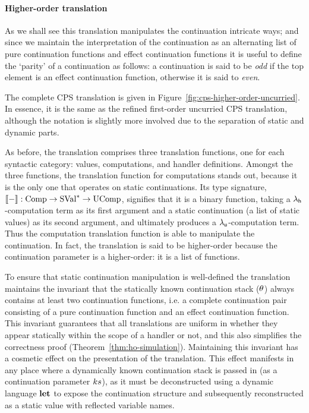\documentclass[12pt,phd,lfcs,twoside,openright,logo,leftchapter,normalheadings]{infthesis}
\theoremstyle{plain}
\theoremstyle{definition}
\begin{document}
\paragraph{Higher-order translation}
%
As we shall see this translation manipulates the continuation
intricate ways; and since we maintain the interpretation of the
continuation as an alternating list of pure continuation functions and
effect continuation functions it is useful to define the `parity' of a
continuation as follows:
%
a continuation is said to be \emph{odd} if the top element is an
effect continuation function, otherwise it is said to \emph{even}.

%

The complete CPS translation is given in
Figure~\ref{fig:cps-higher-order-uncurried}. In essence, it is the
same as the refined first-order uncurried CPS translation, although
the notation is slightly more involved due to the separation of static
and dynamic parts.

As before, the translation comprises three translation functions, one
for each syntactic category: values, computations, and handler
definitions. Amongst the three functions, the translation function for
computations stands out, because it is the only one that operates on
static continuations. Its type signature,
$\llbracket - \rrbracket : \textrm{Comp} \to \textrm{SVal}^\ast \to \textrm{UComp}$, signifies that
it is a binary function, taking a $\lambda_{\mathsf{h}}$-computation term as its
first argument and a static continuation (a list of static values) as
its second argument, and ultimately produces a $\lambda_{\mathsf{u}}$-computation
term. Thus the computation translation function is able to manipulate
the continuation. In fact, the translation is said to be higher-order
because the continuation parameter is a higher-order: it is a list of
functions.

To ensure that static continuation manipulation is well-defined the
translation maintains the invariant that the statically known
continuation stack ($\theta$) always contains at least two continuation
functions, i.e. a complete continuation pair consisting of a pure
continuation function and an effect continuation function.
%
This invariant guarantees that all translations are uniform in whether
they appear statically within the scope of a handler or not, and this
also simplifies the correctness proof
(Theorem~\ref{thm:ho-simulation}).
%
Maintaining this invariant has a cosmetic effect on the presentation
of the translation. This effect manifests in any place where a
dynamically known continuation stack is passed in (as a continuation
parameter $ks$), as it must be deconstructed using a dynamic
language $\mathbf{let}$ to expose the continuation structure and subsequently
reconstructed as a static value with reflected variable names.
\end{document}
